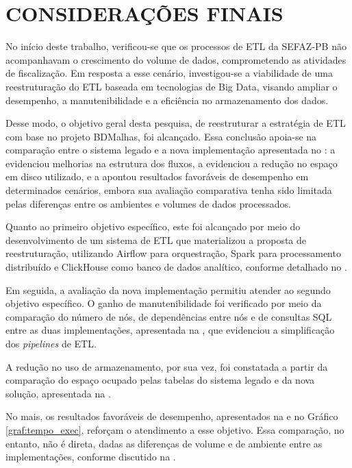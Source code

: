 
\chapter{CONSIDERAÇÕES FINAIS}
\thispagestyle{myheadings}

No início deste trabalho, verificou-se que os processos de ETL da SEFAZ-PB não acompanhavam 
o crescimento do volume de dados, comprometendo as atividades de fiscalização. Em resposta 
a esse cenário, investigou-se a viabilidade de uma reestruturação do ETL baseada em 
tecnologias de Big Data, visando ampliar o desempenho, a manutenibilidade e a eficiência 
no armazenamento dos dados.

Desse modo, o objetivo geral desta pesquisa, de reestruturar a estratégia de ETL com base no
projeto BDMalhas, foi alcançado. Essa conclusão apoia-se na comparação entre o sistema legado e a
nova implementação apresentada no : a 
evidenciou melhorias na estrutura dos fluxos, a  evidenciou a
redução no espaço em disco utilizado, e a  apontou resultados
favoráveis de desempenho em determinados cenários, embora sua avaliação comparativa tenha sido
limitada pelas diferenças entre os ambientes e volumes de dados processados.

Quanto ao primeiro objetivo específico, este foi alcançado por meio do desenvolvimento de
um sistema de ETL que materializou a proposta de reestruturação, utilizando Airflow para
orquestração, Spark para processamento distribuído e ClickHouse como banco de dados
analítico, conforme detalhado no .

Em seguida, a avaliação da nova implementação permitiu atender ao segundo objetivo específico.
O ganho de manutenibilidade foi verificado por meio da comparação do número de nós, de
dependências entre nós e de consultas SQL entre as duas implementações, apresentada na
, que evidenciou a simplificação dos \textit{pipelines}
de ETL. 

A redução no uso de armazenamento, por sua vez, foi constatada a partir da comparação do
espaço ocupado pelas tabelas do sistema legado e da nova solução, apresentada na
. 

No mais, os resultados favoráveis de desempenho, apresentados na  e
no Gráfico \ref{graf:tempo_exec}, reforçam o atendimento a esse objetivo. Essa comparação, no
entanto, não é direta, dadas as diferenças de volume e de ambiente entre as implementações,
conforme discutido na .

